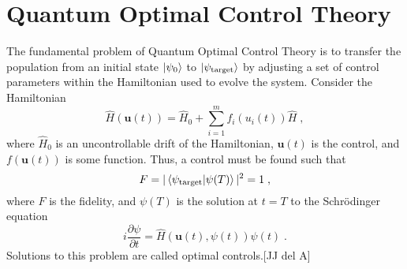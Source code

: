 \chapter{Quantum Optimal Control Theory}
The fundamental problem of Quantum Optimal Control Theory is to transfer the population from an initial state $\ket{\psi_0}$ to $\ket{\psi_{\mathrm{target}}}$ by adjusting a set of control parameters within the Hamiltonian used to evolve the system. Consider the Hamiltonian
\begin{equation}
	\hat{H}(\boldsymbol{u}(t)) = \hat{H}_0 + \sum_{i = 1}^{m} f_i(u_i(t)) \hat{H} \; ,
\end{equation} 
where $\hat{H}_0$ is an uncontrollable drift of the Hamiltonian, $\boldsymbol{u}(t)$ is the control, and $f(\boldsymbol{u}(t))$ is some function. Thus, a control must be found such that 
\begin{equation}
	F = |\braket{\psi_{\mathrm{target}} | \psi (T)}|^2 = 1 \; ,
\end{equation}
where $F$ is the fidelity, and $\psi (T)$ is the solution at $t = T$ to the Schrödinger equation 
\begin{equation}
	i \frac{\partial \psi}{\partial t} = \hat{H} \left( \boldsymbol{u}(t),\psi (t) \right) \psi (t) \; .
\end{equation}
Solutions to this problem are called optimal controls.[JJ del A]


